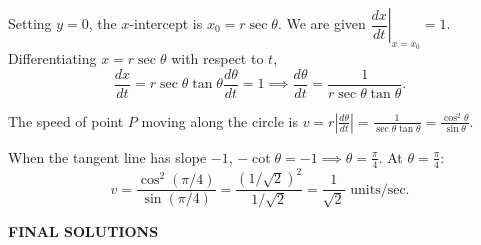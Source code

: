 \documentclass[a4paper, 12pt]{article}
\renewcommand{\headrulewidth}{0pt}
\renewcommand{\headrulewidth}{0pt}
\begin{document}
\begin{enumerate}[leftmargin=*,label=\textbf{\arabic*.}]
Setting $y = 0$, the $x$-intercept is $x_0 = r \sec \theta$. We are given $\left.\dfrac{dx}{dt}\right|_{x=x_0} = 1$. Differentiating $x = r \sec \theta$ with respect to $t$,
\[\frac{dx}{dt} = r \sec \theta \tan \theta \frac{d\theta}{dt} = 1 \implies \frac{d\theta}{dt} = \frac{1}{r \sec \theta \tan \theta}.\]

The speed of point $P$ moving along the circle is $v = r \left|\frac{d\theta}{dt}\right| = \frac{1}{\sec \theta \tan \theta} = \frac{\cos^2 \theta}{\sin \theta}$.

When the tangent line has slope $-1$, $-\cot \theta = -1 \implies \theta = \frac{\pi}{4}$. At $\theta = \frac{\pi}{4}$:
\[v = \frac{\cos^2(\pi/4)}{\sin(\pi/4)} = \frac{(1/\sqrt{2})^2}{1/\sqrt{2}} = \boxed{\frac{1}{\sqrt{2}} \text{ units/sec}}.\]
\end{enumerate}

\newpage
\renewcommand{\headrulewidth}{0pt}
\fancyhead[L]{}
\fancyhead[R]{}

\vspace*{\fill}
\begin{center}
{}
\Huge \textbf{FINAL SOLUTIONS}
\end{center}
\vspace*{\fill}

\newpage
\renewcommand{\headrulewidth}{1pt}

{}

\newpage
\pagestyle{fancy}
\renewcommand{\headrulewidth}{1pt}

\end{document}
